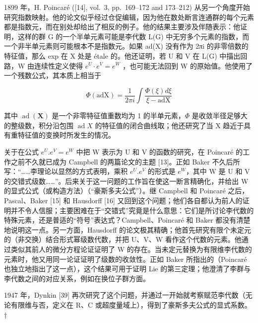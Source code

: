 1899 年，H. Poincaré ({[}14{]}, vol.~3, pp.~169--172 and 173--212) 从另一个角度开始研究指数映射。他的论文似乎经过仓促编辑，因为他在数处断言连通群的每个元素都是指数元，而在别处却给出了相反的例子。他的结果主要涉及伴随表示：他证明，这样的群 G 的一个半单元素可能是李代数 L(G) 中无穷多个元素的指数，而一个非半单元素则可能根本不是指数元。如果 ad(X) 没有作为 2πi 的非零倍数的特征值，那么 exp 在 X 处是 étale 的。他还证明，若 U 和 V 在 L(G) 中描出回路，W 由连续性定义使得 \(e^{U} \cdot e^{V} = e^{W}\) ，也可能无法回到 W 的原始值。他使用了一个残数公式，其本质上相当于

\[
\Phi (\mathrm{adX}) = \frac {1}{2 \pi i} \int \frac {\Phi (\xi) d \xi}{\xi - \mathrm{adX}}
\]

其中 \(\operatorname{ad}(\mathbf{X})\) 是一个非零特征值重数均为 1 的半单元素，\(\Phi\) 是收敛半径足够大的整级数，积分沿包围 \(\operatorname{ad} X\) 的特征值的闭合曲线取；他还研究了当 X 趋近于具有重特征值的变换时所发生的情况。

关于在公式 \(e^{U}.e^{V}=e^{W}\) 中把 W 表示为 U 和 V 的函数的研究，在 Poincaré 的工作之前不久就已成为 Campbell 的两篇论文的主题 {[}13{]}。正如 Baker 不久后所写：“……李理论以显然的方式表明，乘积 \(e^{U}.e^{V}\) 的形式是 \(e^{W}\)，其中 W 是 U 和 V 的交错式级数……”。后来关于这一问题的工作旨在使这一断言精确化，并给出 W 的显式公式（或构造方法）（“豪斯多夫公式”）。继 Campbell 和 Poincaré 之后，Pascal、Baker {[}15{]} 和 Hausdorff {[}16{]} 又回到这个问题；他们各自都认为前人的证明并不令人信服；主要困难在于“交错式”究竟是什么意思：它们是所讨论李代数的特殊元素，还是普适的“符号”表达式？Campbell、Poincaré 和 Baker 都没有清楚地说明这一点。另一方面，Hausdorff 的论文极其精确；他首先研究有限个未定元的（非交换）结合形式幂级数代数，并把 U、V、W 看作这个代数的元素。他通过类似其前人的微分方程论证证明了 W 的存在。当未定元替换为有限维李代数的元素时，他又用同一论证证明了级数的收敛性。正如 Baker 所指出的（Poincaré 也独立地指出了这一点），这个结果可用于证明 Lie 的第三定理；他澄清了李群与李代数之间的对应关系，例如在换位子群方面。

1947 年，Dynkin {[}39{]} 再次研究了这个问题，并通过一开始就考察赋范李代数（无论有限维与否，定义在 R、C 或超度量域上），得到了豪斯多夫公式的显式系数。†


